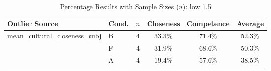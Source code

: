 \begin{table}[ht]
    \centering
    \caption{Percentage Results with Sample Sizes ($n$): low 1.5}
    \begin{tabular}{l l c c c c}
        \toprule
        \textbf{Outlier Source} & \textbf{Cond.} & \textbf{$n$} & \textbf{Closeness} & \textbf{Competence} & \textbf{Average} \\
        \midrule
        mean\_cultural\_closeness\_subj & B & 4 & 33.3\% & 71.4\% & 52.3\% \\
         & F & 4 & 31.9\% & 68.6\% & 50.3\% \\
         & A & 4 & 19.4\% & 57.6\% & 38.5\% \\
        \bottomrule
    \end{tabular}
\end{table}
